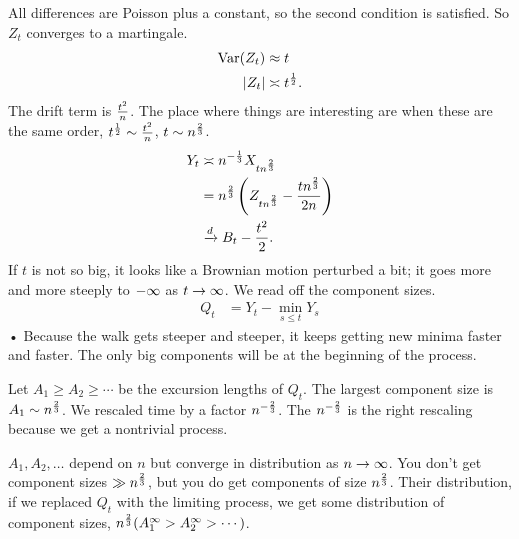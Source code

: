All differences are Poisson plus a constant, so the second condition is satisfied. So $Z_t$ converges to a martingale.
\begin{align}
\operatorname{Var}(Z_t)&\approx t\\
|Z_t|&\asymp t^{\frac{1}{2}}.
\end{align}
The drift term is $\frac{t^2}{n}$.
The place where things are interesting are when these are the same order, $t^{\frac{1}{2}}\sim \frac{t^2}{n}$,  $t\sim n^{\frac{2}{3}}$. 
\begin{align}
Y_t&\asymp n^{-\frac{1}{3}} X_{tn^{\frac{2}{3}}}\\
&= n^{\frac{2}{3}}\left( {Z_{tn^{\frac{2}{3}}} - \frac{tn^{\frac{2}{3}}}{2n}} \right)\\
&\xrightarrow{d} B_t - \frac{t^2}{2}.
\end{align}
If $t$ is not so big, it looks like a Brownian motion perturbed a bit; it goes  more and more steeply to $-\infty$ as $t\to \infty$.
We read off the component sizes.
\begin{align}
Q_t &= Y_t - \min_{s\le t} Y_s
\end{align}•
Because the walk gets steeper and steeper, it keeps getting new minima faster and faster. The only big components will be at the beginning of the process.

Let $A_1\ge A_2\ge \cdots$ be the excursion lengths of $Q_t$. The largest component size is $A_1\sim n^{\frac{2}{3}}$.
We rescaled time by a factor $n^{-\frac{2}{3}}$. The $n^{-\frac{2}{3}}$ is the right rescaling because we get a nontrivial process.

$A_1,A_2,\ldots$ depend on $n$ but converge in distribution as $n\to \infty$. 
You don't get component sizes $\gg n^{\frac{2}{3}}$, but you do get components of size $n^{\frac{2}{3}}$. Their distribution, if we replaced $Q_t$ with the limiting process, we get some distribution of component sizes, $n^{\frac{2}{3}}(A_1^\infty > A_2^\infty>\cdots)$.


